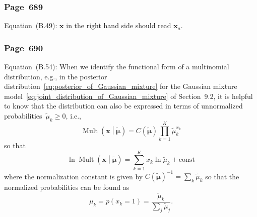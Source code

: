 \documentclass[12pt,a4paper]{article}
\newcommand{\erratum}[1]{\subsubsection*{#1}}
\begin{document}
\erratum{Page~689}
Equation~(B.49):
$\mathbf{x}$ in the right hand side should read $\mathbf{x}_{a}$.

\erratum{Page~690}
Equation~(B.54):
When we identify the functional form of a multinomial distribution, e.g.,
in the posterior distribution~\eqref{eq:posterior_of_Gaussian_mixture} for
the Gaussian mixture model~\eqref{eq:joint_distribution_of_Gaussian_mixture} of Section~9.2,
it is helpful to know that the distribution can also be expressed
in terms of unnormalized probabilities~$\widetilde{\mu}_k \geqslant 0$, i.e.,
\begin{equation}
\operatorname{Mult}\left(\mathbf{x}\middle|\widetilde{\bm{\mu}}\right) =
  C(\widetilde{\bm{\mu}}) \prod_{k=1}^{K} \widetilde{\mu}_{k}^{x_k}
\end{equation}
so that
\begin{equation}
\ln\operatorname{Mult}\left(\mathbf{x}\middle|\widetilde{\bm{\mu}}\right) =
  \sum_{k=1}^{K} {x_k}\ln{\widetilde{\mu}_k} + \text{const}
\end{equation}
where the normalization constant is given by
${C(\widetilde{\bm{\mu}})}^{-1} = \sum_{k} \widetilde{\mu}_k$
so that the normalized probabilities can be found as
\begin{equation}
\mu_k = p(x_k = 1) = \frac{\widetilde{\mu}_k}{\sum_{j} \widetilde{\mu}_j} .
\end{equation}
\end{document}
